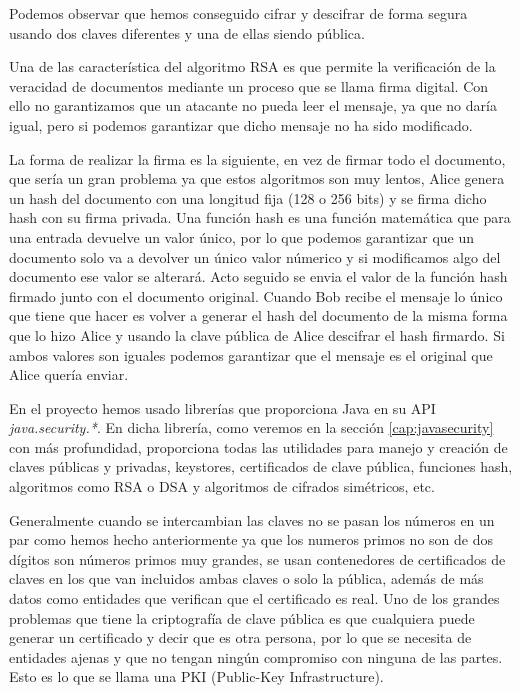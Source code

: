Podemos observar que hemos conseguido cifrar y descifrar de forma segura usando dos claves diferentes y una de ellas siendo pública.

Una de las característica del algoritmo RSA es que permite la verificación de la veracidad de documentos mediante un proceso que se llama firma digital. Con ello no garantizamos que un atacante no pueda leer el mensaje, ya que no daría igual, pero si podemos garantizar que dicho mensaje no ha sido modificado. 

La forma de realizar la firma es la siguiente, en vez de firmar todo el documento, que sería un gran problema ya que estos algoritmos son muy lentos, Alice genera un hash del documento con una longitud fija (128 o 256 bits) y se firma dicho hash con su firma privada. Una función hash es una función matemática que para una entrada devuelve un valor único, por lo que podemos garantizar que un documento solo va a devolver un único valor númerico y si modificamos algo del documento ese valor se alterará. Acto seguido se envia el valor de la función hash firmado junto con el documento original. Cuando Bob recibe el mensaje lo único que tiene que hacer es volver a generar el hash del documento de la misma forma que lo hizo Alice y usando la clave pública de Alice descifrar el hash firmardo. Si ambos valores son iguales podemos garantizar que el mensaje es el original que Alice quería enviar.

En el proyecto hemos usado librerías que proporciona Java en su API \textit{java.security.*}. En dicha librería, como veremos en la sección \ref{cap:javasecurity} con más profundidad, proporciona todas las utilidades para manejo y creación de claves públicas y privadas, keystores, certificados de clave pública, funciones hash, algoritmos como RSA o DSA y algoritmos de cifrados simétricos, etc. 

Generalmente cuando se intercambian las claves no se pasan los números en un par como hemos hecho anteriormente ya que los numeros primos no son de dos dígitos son números primos muy grandes, se usan contenedores de certificados de claves en los que van incluidos ambas claves o solo la pública, además de más datos como entidades que verifican que el certificado es real. Uno de los grandes problemas que tiene la criptografía de clave pública es que cualquiera puede generar un certificado y decir que es otra persona, por lo que se necesita de entidades ajenas y que no tengan ningún compromiso con ninguna de las partes. Esto es lo que se llama una PKI (Public-Key Infrastructure).


